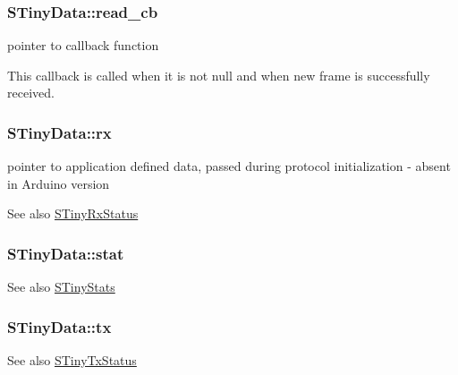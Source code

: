 \subsubsection[{read\+\_\+cb}]{ S\+Tiny\+Data\+::read\+\_\+cb}\label{structSTinyData_a31ba50154472c11e0d063b0aeef95f4d}


pointer to callback function 

This callback is called when it is not null and when new frame is successfully received. \hypertarget{structSTinyData_aa3b43db99a1a6bf3d562f932d5a539db}{}
\subsubsection[{rx}]{ S\+Tiny\+Data\+::rx}\label{structSTinyData_aa3b43db99a1a6bf3d562f932d5a539db}


pointer to application defined data, passed during protocol initialization -\/ absent in Arduino version 

\begin{DoxySeeAlso}{See also}
\hyperlink{structSTinyRxStatus}{S\+Tiny\+Rx\+Status} 
\end{DoxySeeAlso}
\hypertarget{structSTinyData_a16ba8c9e60d6aee3fcd4909f85561f3d}{}
\subsubsection[{stat}]{ S\+Tiny\+Data\+::stat}\label{structSTinyData_a16ba8c9e60d6aee3fcd4909f85561f3d}
\begin{DoxySeeAlso}{See also}
\hyperlink{structSTinyStats}{S\+Tiny\+Stats} 
\end{DoxySeeAlso}
\hypertarget{structSTinyData_aa099adb35f3494332747eb18851fbb23}{}
\subsubsection[{tx}]{ S\+Tiny\+Data\+::tx}\label{structSTinyData_aa099adb35f3494332747eb18851fbb23}
\begin{DoxySeeAlso}{See also}
\hyperlink{structSTinyTxStatus}{S\+Tiny\+Tx\+Status} 
\end{DoxySeeAlso}
\hypertarget{structSTinyData_ada334c88e86bfd2c10191f65818c3fb3}{}
